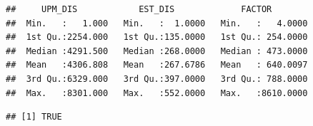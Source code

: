 \documentclass[
]{article}
\newenvironment{Shaded}{\begin{snugshade}}{\end{snugshade}}
\newcommand{\CommentTok}[1]{\textcolor[rgb]{0.56,0.35,0.01}{\textit{#1}}}
\newcommand{\DecValTok}[1]{\textcolor[rgb]{0.00,0.00,0.81}{#1}}
\newcommand{\KeywordTok}[1]{\textcolor[rgb]{0.13,0.29,0.53}{\textbf{#1}}}
\newcommand{\NormalTok}[1]{#1}
\newcommand{\OperatorTok}[1]{\textcolor[rgb]{0.81,0.36,0.00}{\textbf{#1}}}
\newcommand{\StringTok}[1]{\textcolor[rgb]{0.31,0.60,0.02}{#1}}
\begin{document}
\begin{verbatim}
##     UPM_DIS            EST_DIS             FACTOR         
##  Min.   :   1.000   Min.   :  1.0000   Min.   :   4.0000  
##  1st Qu.:2254.000   1st Qu.:135.0000   1st Qu.: 254.0000  
##  Median :4291.500   Median :268.0000   Median : 473.0000  
##  Mean   :4306.808   Mean   :267.6786   Mean   : 640.0097  
##  3rd Qu.:6329.000   3rd Qu.:397.0000   3rd Qu.: 788.0000  
##  Max.   :8301.000   Max.   :552.0000   Max.   :8610.0000
\end{verbatim}

\begin{Shaded}
\end{Shaded}

\begin{verbatim}
## [1] TRUE
\end{verbatim}
\end{document}
